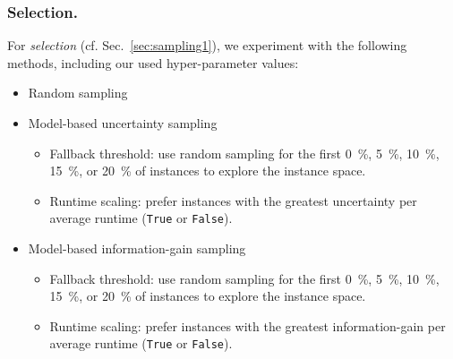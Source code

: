 \documentclass[runningheads]{llncs}
\begin{document}
\subsubsection{Selection.}
For \textit{selection} (cf. Sec.~\ref{sec:sampling1}), we experiment with the following methods, including our used hyper-parameter values:
\begin{itemize}
  \item Random sampling 
  \item Model-based uncertainty sampling
  \begin{itemize}
    \item Fallback threshold: use random sampling for the first \SI{0}{\%}, \SI{5}{\%}, \SI{10}{\%}, \SI{15}{\%}, or \SI{20}{\%} of instances to explore the instance space.
    \item Runtime scaling: prefer instances with the greatest uncertainty per average runtime (\texttt{True} or \texttt{False}).
  \end{itemize}

  \item Model-based information-gain sampling
  \begin{itemize}
    \item Fallback threshold: use random sampling for the first \SI{0}{\%}, \SI{5}{\%}, \SI{10}{\%}, \SI{15}{\%}, or \SI{20}{\%} of instances to explore the instance space.
    \item Runtime scaling: prefer instances with the greatest information-gain per average runtime (\texttt{True} or \texttt{False}).
  \end{itemize}
\end{itemize}
\end{document}
